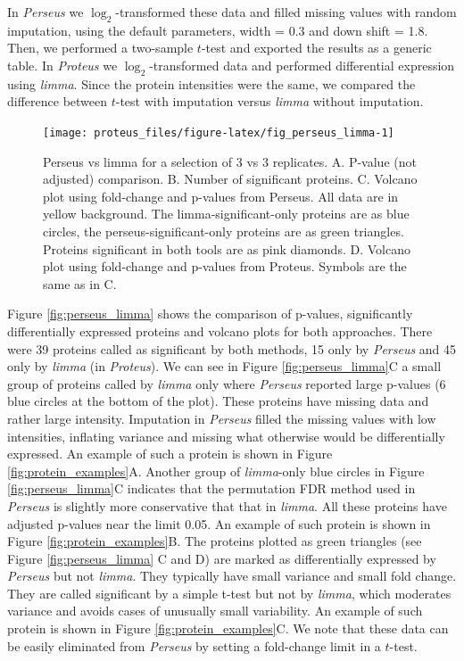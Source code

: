 \documentclass[]{article}
\begin{document}
In \emph{Perseus} we \(\log_2\)-transformed these data and filled
missing values with random imputation, using the default parameters,
width = 0.3 and down shift = 1.8. Then, we performed a two-sample
\(t\)-test and exported the results as a generic table. In
\emph{Proteus} we \(\log_2\)-transformed data and performed differential
expression using \emph{limma}. Since the protein intensities were the
same, we compared the difference between \(t\)-test with imputation
versus \emph{limma} without imputation.

\begin{figure}[H]

{\centering \texttt{[image: proteus\_files/figure-latex/fig\_perseus\_limma-1]} 

}

\caption{\label{fig:perseus_limma}Perseus vs limma for a selection of 3 vs 3 replicates. A. P-value (not adjusted) comparison. B. Number of significant proteins. C. Volcano plot using fold-change and p-values from Perseus. All data are in yellow background. The limma-significant-only proteins are as blue circles, the perseus-significant-only proteins are as green triangles. Proteins significant in both tools are as pink diamonds. D. Volcano plot using fold-change and p-values from Proteus. Symbols are the same as in C.}\label{fig:fig_perseus_limma}
\end{figure}

Figure \ref{fig:perseus_limma} shows the comparison of p-values,
significantly differentially expressed proteins and volcano plots for
both approaches. There were 39 proteins called as significant by both
methods, 15 only by \emph{Perseus} and 45 only by \emph{limma} (in
\emph{Proteus}). We can see in Figure \ref{fig:perseus_limma}C a small
group of proteins called by \emph{limma} only where \emph{Perseus}
reported large p-values (6 blue circles at the bottom of the plot).
These proteins have missing data and rather large intensity. Imputation
in \emph{Perseus} filled the missing values with low intensities,
inflating variance and missing what otherwise would be differentially
expressed. An example of such a protein is shown in Figure
\ref{fig:protein_examples}A. Another group of \emph{limma}-only blue
circles in Figure \ref{fig:perseus_limma}C indicates that the
permutation FDR method used in \emph{Perseus} is slightly more
conservative that that in \emph{limma}. All these proteins have adjusted
p-values near the limit 0.05. An example of such protein is shown in
Figure \ref{fig:protein_examples}B. The proteins plotted as green
triangles (see Figure \ref{fig:perseus_limma} C and D) are marked as
differentially expressed by \emph{Perseus} but not \emph{limma}. They
typically have small variance and small fold change. They are called
significant by a simple t-test but not by \emph{limma}, which moderates
variance and avoids cases of unusually small variability. An example of
such protein is shown in Figure \ref{fig:protein_examples}C. We note
that these data can be easily eliminated from \emph{Perseus} by setting
a fold-change limit in a \(t\)-test.
\end{document}
